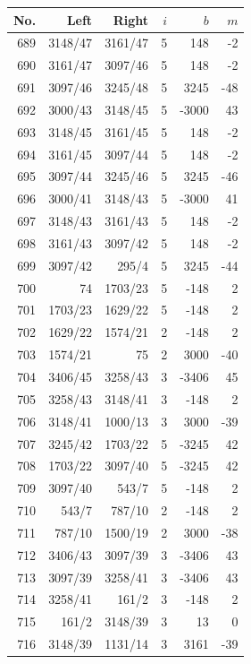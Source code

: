 \documentclass[11pt,a4paper]{article}
\begin{document}
\noindent\begin{minipage}[t]{.49\linewidth}\centering\footnotesize\setlength{\tabcolsep}{2pt}\renewcommand{\arraystretch}{1.09}
\begin{tabular*}{\linewidth}{@{}r@{\extracolsep{\fill}}rrrrr@{}}\toprule
No. & Left & Right & $i$ & $b$ & $m$\\\midrule
689 & 3148/47 & 3161/47 & 5 & 148 & -2\\
690 & 3161/47 & 3097/46 & 5 & 148 & -2\\
691 & 3097/46 & 3245/48 & 5 & 3245 & -48\\
692 & 3000/43 & 3148/45 & 5 & -3000 & 43\\
693 & 3148/45 & 3161/45 & 5 & 148 & -2\\
694 & 3161/45 & 3097/44 & 5 & 148 & -2\\
695 & 3097/44 & 3245/46 & 5 & 3245 & -46\\
696 & 3000/41 & 3148/43 & 5 & -3000 & 41\\
697 & 3148/43 & 3161/43 & 5 & 148 & -2\\
698 & 3161/43 & 3097/42 & 5 & 148 & -2\\
699 & 3097/42 & 295/4 & 5 & 3245 & -44\\
700 & 74 & 1703/23 & 5 & -148 & 2\\
701 & 1703/23 & 1629/22 & 5 & -148 & 2\\
702 & 1629/22 & 1574/21 & 2 & -148 & 2\\
703 & 1574/21 & 75 & 2 & 3000 & -40\\
704 & 3406/45 & 3258/43 & 3 & -3406 & 45\\
705 & 3258/43 & 3148/41 & 3 & -148 & 2\\
706 & 3148/41 & 1000/13 & 3 & 3000 & -39\\
707 & 3245/42 & 1703/22 & 5 & -3245 & 42\\
708 & 1703/22 & 3097/40 & 5 & -3245 & 42\\
709 & 3097/40 & 543/7 & 5 & -148 & 2\\
710 & 543/7 & 787/10 & 2 & -148 & 2\\
711 & 787/10 & 1500/19 & 2 & 3000 & -38\\
712 & 3406/43 & 3097/39 & 3 & -3406 & 43\\
713 & 3097/39 & 3258/41 & 3 & -3406 & 43\\
714 & 3258/41 & 161/2 & 3 & -148 & 2\\
715 & 161/2 & 3148/39 & 3 & 13 & 0\\
716 & 3148/39 & 1131/14 & 3 & 3161 & -39\\

\end{tabular*}
\end{minipage}
\end{document}
